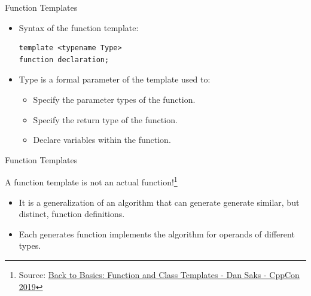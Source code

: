 \documentclass[14pt,aspectratio=1610, hyperref={pdfpagelayout=SinglePage}]{beamer}
\begin{document}
\begin{frame}[fragile]{Function Templates}
\protect\hypertarget{function-templates}{}
\begin{itemize}
\item
  Syntax of the function template:
\begin{lstlisting}
template <typename Type>
function declaration;
\end{lstlisting}
\item
  Type is a formal parameter of the template used to:
  \begin{itemize}
  \item
    Specify the parameter types of the function.
  \item
    Specify the return type of the function.
  \item
    Declare variables within the function.
  \end{itemize}
\end{itemize}
\end{frame}

\begin{frame}{Function Templates}

  {\large{A function template is not an actual function!}}\footnote[frame]{\tiny Source: \href{https://youtu.be/LMP_sxOaz6g}{Back to Basics: Function and Class Templates - Dan Saks - CppCon 2019}}

\begin{itemize}
\item
  It is a generalization of an algorithm that can generate generate similar, but distinct, function definitions.
\item
  Each generates function implements the algorithm for operands of different types.
\end{itemize}
\end{frame}

\end{document}

